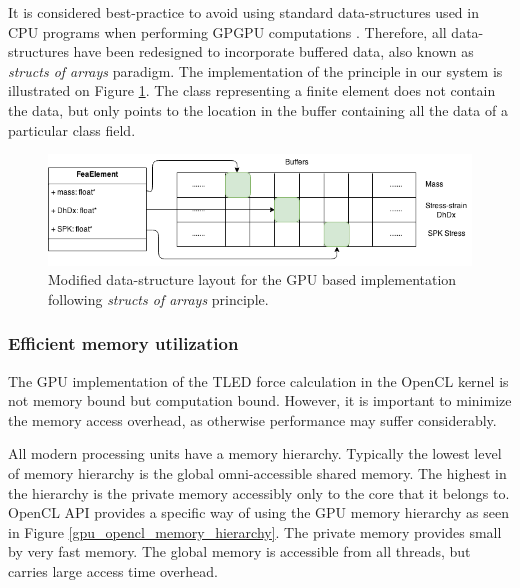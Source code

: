   It is considered best-practice to avoid using standard data-structures used in CPU programs when performing GPGPU computations \cite{opencl_programming_munshi}. Therefore, all data-structures have been redesigned to incorporate buffered data, also known as \textit{structs of arrays} paradigm. The implementation of the principle in our system is illustrated on Figure \ref{gpu-structs-vs-arrays}. The class representing a finite element does not contain the data, but only points to the location in the buffer containing all the data of a particular class field.

  \begin{figure}
    \centering
      \includegraphics[width=120mm]{sections/methodology/images/gpu/structs-vs-arrays.png}
    \caption{\label{gpu-structs-vs-arrays} Modified data-structure layout for the GPU based implementation following \textit{structs of arrays} principle.}
  \end{figure}


  \subsubsection{Efficient memory utilization}

  The GPU implementation of the TLED force calculation in the OpenCL kernel is not memory bound but computation bound. However, it is important to minimize the memory access overhead, as otherwise performance may suffer considerably.

  All modern processing units have a memory hierarchy. Typically the lowest level of memory hierarchy is the global omni-accessible shared memory. The highest in the hierarchy is the private memory accessibly only to the core that it belongs to. OpenCL API provides a specific way of using the GPU memory hierarchy \cite{opencl_programming_munshi} as seen in Figure \ref{gpu_opencl_memory_hierarchy}. The private memory provides small by very fast memory. The global memory is accessible from all threads, but carries large access time overhead.

